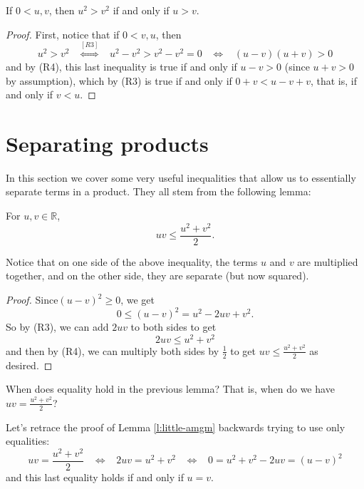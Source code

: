 \documentclass[11pt,dvipsnames]{book}
\numberwithin{figure}{section} %
\numberwithin{table}{section} %
\begin{document}
\begin{proposition}
\label{p:u^2>v^2}
If $0<u,v$, then $u^2>v^2$ if and only if $u>v$.
\end{proposition}

\begin{proof}
First, notice that if $0<v,u$, then
\[
u^2>v^2 \;\;\;   \stackrel{[R3]}{ \Longleftrightarrow} \;\;\;  u^2-v^2>v^2-v^2=0 \;\;\;  \Longleftrightarrow \;\;\;  (u-v)(u+v)>0
\]
and by (R4), this last inequality is true if and only if $u-v>0$ (since $u+v>0$ by assumption), which by (R3) is true if and only if $0+v<u-v+v$, that is, if and only if $v<u$.
\end{proof}

\section{Separating products}%
\label{separatingproducts}

In this section we cover some very useful inequalities that allow us to essentially separate terms in a product. They all stem from the following lemma:

\begin{lemma}
\label{l:little-amgm}
For $u,v\in\mathbb{R}$,
\[uv \leq \frac{u^2+v^2}{2}.\]
\end{lemma}
Notice that on one side of the above inequality, the terms $u$ and $v$ are multiplied together, and on the other side, they are separate (but now squared).

\begin{proof}
Since$(u-v)^2\geq 0$, we get
\[
0\leq (u-v)^2 =u^2-2uv + v^2.\]
So by (R3), we can add $2uv$ to both sides to get
\[
2uv \leq u^2+v^2\]
and then by (R4), we can multiply both sides by $\frac{1}{2}$ to get $uv \leq \frac{u^2+v^2}{2}$ as desired.
\end{proof}

\begin{exercise}
\label{ex:uv=u^2+v^2/2}
When does equality hold in the previous lemma? That is, when do we have $uv = \frac{u^2+v^2}{2}$?
\end{exercise}

\begin{solution}
Let's retrace the proof of  Lemma \ref{l:little-amgm} backwards trying to use only equalities:
\[
uv = \frac{u^2+v^2}{2} \;\;\; \Longleftrightarrow \;\;\; 2uv = u^2+v^2
 \;\;\; \Longleftrightarrow \;\;\; 0=u^2+v^2-2uv = (u-v)^{2}
 \]
 and this last equality holds if and only if $u=v$.
 \end{solution}
\end{document}
